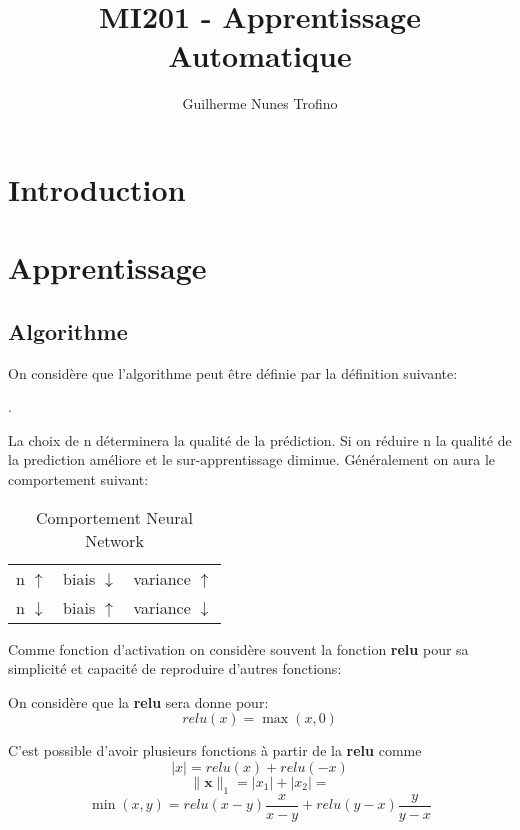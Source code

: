 \documentclass{article}
\title{MI201 - Apprentissage Automatique}
\author{Guilherme Nunes Trofino}
\begin{document}
\maketitle
\setlength{\parindent}{0pt}

\newpage\tableofcontents

\section{Introduction}

% 
% 

\section{Apprentissage}
\subsection{Algorithme}
On considère que l'algorithme peut être définie par la définition suivante:
\begin{definition}
    .
\end{definition}

La choix de n déterminera la qualité de la prédiction. Si on réduire n la qualité de la prediction améliore et le sur-apprentissage diminue. Généralement on aura le comportement suivant:
\begin{table}[H]
    \centering\begin{tabular}{lll}
        n $\uparrow$   & biais $\downarrow$ & variance $\uparrow$\\
        n $\downarrow$ & biais $\uparrow  $ & variance $\downarrow$\\
    \end{tabular}
    \caption{Comportement Neural Network}
\end{table}

Comme fonction d'activation on considère souvent la fonction \textbf{relu} pour sa simplicité et capacité de reproduire d'autres fonctions:
\begin{definition}
    On considère que la \textbf{relu} sera donne pour:
    \begin{equation}
        \boxed{
            relu(x) = \max(x, 0)
        }
    \end{equation}
\end{definition}
C'est possible d'avoir plusieurs fonctions à partir de la \textbf{relu} comme 
\begin{equation}
    |x| = relu(x) + relu(-x)
\end{equation}
\begin{equation}
    \| \mathbf{x}  \|_{1} = |x_{1}| + |x_{2}| = 
\end{equation}
\begin{equation}
    \min(x, y) = relu(x-y)\frac{x}{x-y} + relu(y-x)\frac{y}{y-x}
\end{equation}
\end{document}
